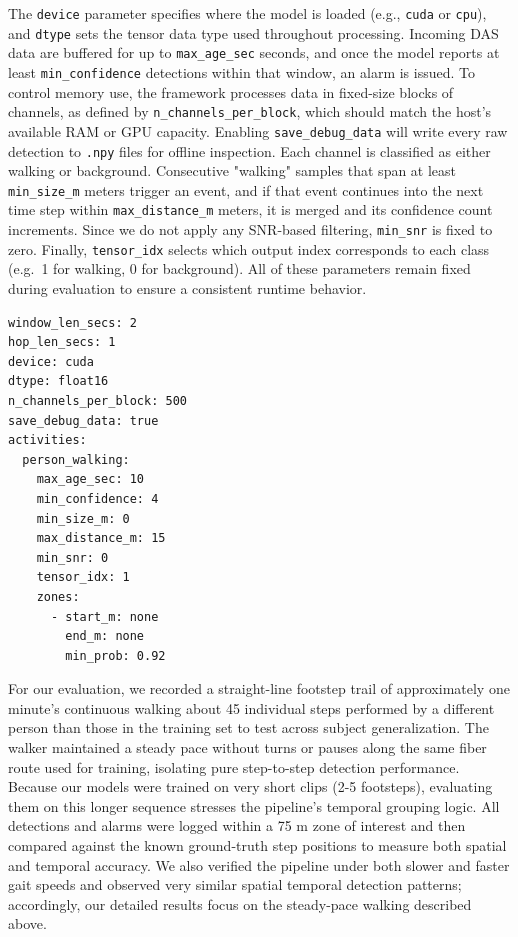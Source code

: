 The \texttt{device} parameter specifies where the model is loaded (e.g., \texttt{cuda} or \texttt{cpu}), and \texttt{dtype} sets the tensor data type used throughout processing. Incoming DAS data are buffered for up to \texttt{max\_age\_sec} seconds, and once the model reports at least \texttt{min\_confidence} detections within that window, an alarm is issued. To control memory use, the framework processes data in fixed-size blocks of channels, as defined by \texttt{n\_channels\_per\_block}, which should match the host's available RAM or GPU capacity. Enabling \texttt{save\_debug\_data} will write every raw detection to \texttt{.npy} files for offline inspection. 
Each channel is classified as either walking or background. Consecutive "walking" samples that span at least \texttt{min\_size\_m} meters trigger an event, and if that event continues into the next time step within \texttt{max\_distance\_m} meters, it is merged and its confidence count increments. Since we do not apply any SNR-based filtering, \texttt{min\_snr} is fixed to zero. Finally, \texttt{tensor\_idx} selects which output index corresponds to each class (e.g.\ 1 for walking, 0 for background). All of these parameters remain fixed during evaluation to ensure a consistent runtime behavior.

\begin{lstlisting}[style=pythonstyle, caption={YAML configuration for the real-time DAS evaluation framework}, label={lst:config_yaml}]
window_len_secs: 2
hop_len_secs: 1
device: cuda
dtype: float16
n_channels_per_block: 500
save_debug_data: true
activities:
  person_walking:
    max_age_sec: 10
    min_confidence: 4
    min_size_m: 0
    max_distance_m: 15
    min_snr: 0
    tensor_idx: 1
    zones:
      - start_m: none
        end_m: none
        min_prob: 0.92
\end{lstlisting}

For our evaluation, we recorded a straight-line footstep trail of approximately one minute's continuous walking about 45 individual steps performed by a different person than those in the training set to test across subject generalization. The walker maintained a steady pace without turns or pauses along the same fiber route used for training, isolating pure step-to-step detection performance. Because our models were trained on very short clips (2-5 footsteps), evaluating them on this longer sequence stresses the pipeline's temporal grouping logic. All detections and alarms were logged within a 75 m zone of interest and then compared against the known ground-truth step positions to measure both spatial and temporal accuracy. We also verified the pipeline under both slower and faster gait speeds and observed very similar spatial temporal detection patterns; accordingly, our detailed results focus on the steady-pace walking described above.


